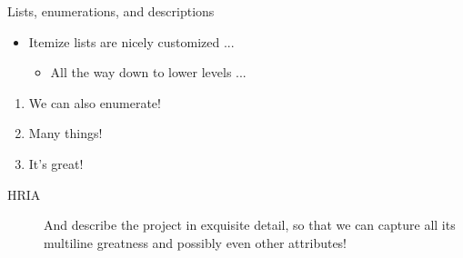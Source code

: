\documentclass[final]{beamer}
\begin{document}
\begin{frame}[t,fragile]
\begin{block}{Lists, enumerations, and descriptions}

\begin{itemize}
    \item Itemize lists are nicely customized ...
    \begin{itemize}
        \item All the way down to lower levels ...
    \end{itemize}
\end{itemize}


\begin{enumerate}
    \item We can also enumerate!
    \item Many things!
    \item It's great!
\end{enumerate}


\begin{description}
    \item[HRIA] And describe the project in exquisite detail, so that we
        can capture all its multiline greatness and possibly even other attributes!
\end{description}
\end{block}

\end{frame}
\end{document}
